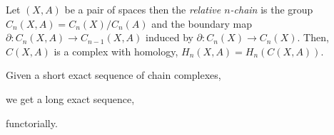 \documentclass[12pt]{extarticle}
\begin{document}
\begin{definition}
Let $(X, A)$ be a pair of spaces then the \textit{relative $n$-chain} is the group $C_n(X, A) = C_n(X) / C_n(A)$ and the boundary map $\partial : C_n(X, A) \to C_{n-1}(X, A)$ induced by $\partial : C_n(X) \to C_n(X)$. Then, $C(X, A)$ is a complex with homology, $H_n(X, A) = H_n(C(X, A))$.  
\end{definition}

\begin{lemma}
Given a short exact sequence of chain complexes,
\begin{center}
\end{center}
we get a long exact sequence,

\begin{center}
\end{center} 

functorially.
\end{lemma}
\end{document}
